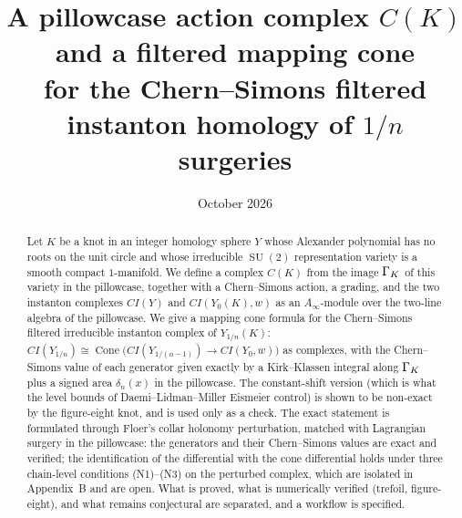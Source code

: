 \documentclass[11pt]{amsart}
\title[A pillowcase action complex for surgeries]{A pillowcase action complex $C(K)$ and a filtered mapping cone\\ for the Chern--Simons filtered instanton homology of $1/n$ surgeries}
\date{October 2026}
\theoremstyle{definition}
\theoremstyle{remark}
\newcommand{\CI}{\mathit{CI}}\newcommand{\cs}{\mathrm{cs}}\newcommand{\gr}{\mathrm{gr}}
\DeclareMathOperator{\Cone}{Cone}\DeclareMathOperator{\Hom}{Hom}\DeclareMathOperator{\SU}{SU}\DeclareMathOperator{\SO}{SO}
\begin{document}
\begin{abstract}
Let $K$ be a knot in an integer homology sphere $Y$ whose Alexander polynomial has no roots on the unit circle and whose irreducible $\SU(2)$ representation variety is a smooth compact $1$-manifold.  We define a complex $C(K)$ from the image $\Gamma_K$ of this variety in the pillowcase, together with a Chern--Simons action, a grading, and the two instanton complexes $\CI(Y)$ and $\CI(Y_0(K),w)$ as an $A_\infty$-module over the two-line algebra of the pillowcase.  We give a mapping cone formula for the Chern--Simons filtered irreducible instanton complex of $Y_{1/n}(K)$: $\CI(Y_{1/n})\cong\Cone\big(\CI(Y_{1/(n-1)})\to\CI(Y_0,w)\big)$ as complexes, with the Chern--Simons value of each generator given exactly by a Kirk--Klassen integral along $\Gamma_K$ plus a signed area $\delta_n(x)$ in the pillowcase.  The constant-shift version (which is what the level bounds of Daemi--Lidman--Miller Eismeier control) is shown to be non-exact by the figure-eight knot, and is used only as a check.  The exact statement is formulated through Floer's collar holonomy perturbation, matched with Lagrangian surgery in the pillowcase: the generators and their Chern--Simons values are exact and verified; the identification of the differential with the cone differential holds under three chain-level conditions (N1)--(N3) on the perturbed complex, which are isolated in Appendix~B and are open.  What is proved, what is numerically verified (trefoil, figure-eight), and what remains conjectural are separated, and a workflow is specified.
\end{abstract}
\maketitle
\setcounter{tocdepth}{1}\tableofcontents








\appendix



\end{document}
